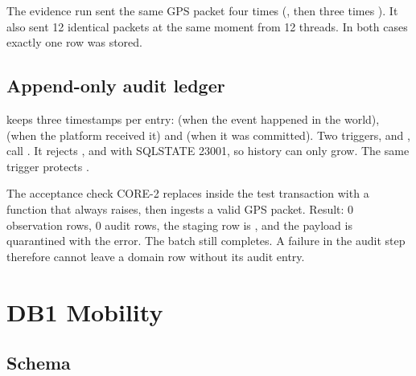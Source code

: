\documentclass[11pt,a4paper]{article}
\begin{document}
The evidence run sent the same GPS packet four times (, then three times
). It also sent 12 identical packets at the same moment from 12 threads.
In both cases exactly one row was stored.

\subsection{Append-only audit ledger}

 keeps three timestamps per entry:  (when the
event happened in the world),  (when the platform received it) and
 (when it was committed). Two triggers, 
and , call . It rejects
,  and  with SQLSTATE 23001, so history can only
grow. The same trigger protects .

\begin{notebox}
The acceptance check CORE-2 replaces  inside the test transaction with
a function that always raises, then ingests a valid GPS packet. Result: 0 observation rows,
0 audit rows, the staging row is , and the payload is quarantined with the
error. The batch still completes. A failure in the audit step therefore cannot leave a
domain row without its audit entry.
\end{notebox}

\section{DB1 Mobility}\label{sec:db1}

\subsection{Schema}
\end{document}
